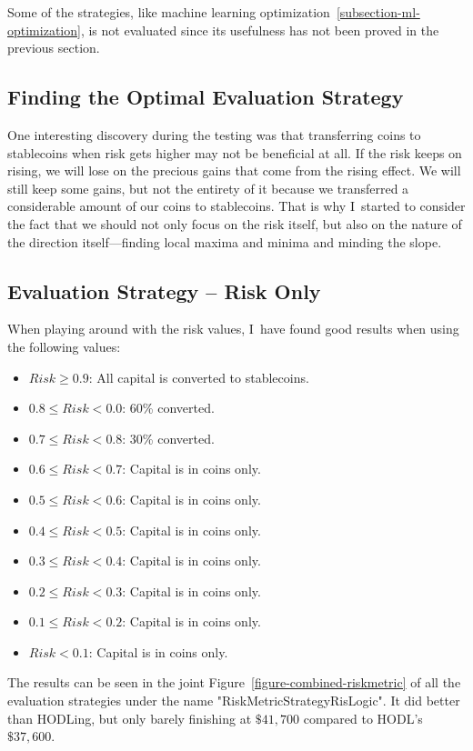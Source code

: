 Some of the strategies, like machine learning optimization~\ref{subsection-ml-optimization}, is not evaluated since its usefulness has not been proved in the previous section.

\subsection*{Finding the Optimal Evaluation Strategy}
One interesting discovery during the testing was that transferring coins to stablecoins when risk gets higher may not be beneficial at all. If the risk keeps on rising, we will lose on the precious gains that come from the rising effect. We will still keep some gains, but not the entirety of it because we transferred a considerable amount of our coins to stablecoins. That is why I~started to consider the fact that we should not only focus on the risk itself, but also on the nature of the direction itself---finding local maxima and minima and minding the slope.

\subsection*{Evaluation Strategy -- Risk Only}
When playing around with the risk values, I~have found good results when using the following values:
\begin{itemize}
    \item $Risk \ge  0.9$: All capital is converted to stablecoins.
    \item $0.8 \le Risk < 0.0$: 60\% converted.
    \item $0.7 \le Risk < 0.8$: 30\% converted.
    \item $0.6 \le Risk < 0.7$: Capital is in coins only.
    \item $0.5 \le Risk < 0.6$: Capital is in coins only.
    \item $0.4 \le Risk < 0.5$: Capital is in coins only.
    \item $0.3 \le Risk < 0.4$: Capital is in coins only.
    \item $0.2 \le Risk < 0.3$: Capital is in coins only.
    \item $0.1 \le Risk < 0.2$: Capital is in coins only.
    \item $Risk < 0.1$: Capital is in coins only.
\end{itemize}

The results can be seen in the joint Figure~\ref{figure-combined-riskmetric} of all the evaluation strategies under the name "RiskMetricStrategyRisLogic". It did better than HODLing, but only barely finishing at $\$41,700$ compared to HODL's $\$37,600$.

